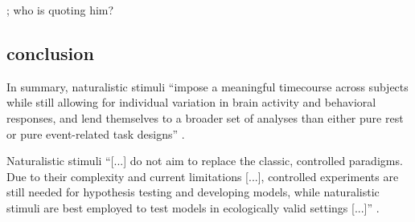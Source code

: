 \citep{bazeille2019local}; who is quoting him?


\subsection{conclusion}

In summary, naturalistic stimuli ``impose a meaningful timecourse across
subjects while still allowing for individual variation in brain activity and
behavioral responses, and lend themselves to a broader set of analyses than
either pure rest or pure event-related task designs'' \citep{finn2017can}.

Naturalistic stimuli ``[...] do not aim to replace the classic, controlled
paradigms. Due to their complexity and current limitations [...], controlled
experiments are still needed for hypothesis testing and developing models, while
naturalistic stimuli are best employed to test models in ecologically valid
settings [...]'' \citep{saarimaki2021naturalistic}.
